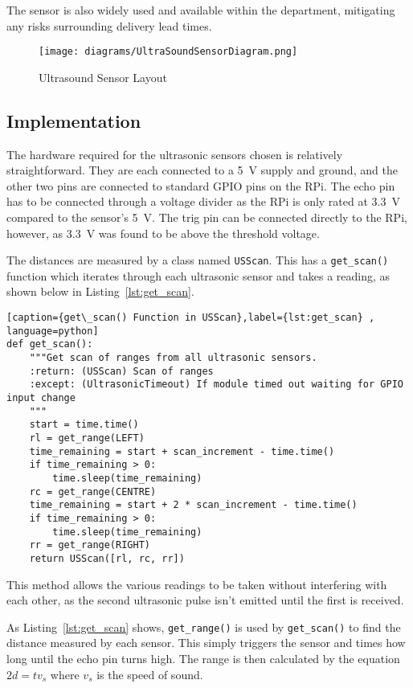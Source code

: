 The sensor is also widely used and available within the
department, mitigating any risks surrounding delivery lead times.

\begin{figure}[!ht]
	\centering
	\texttt{[image: diagrams/UltraSoundSensorDiagram.png]}
	\caption{Ultrasound Sensor Layout}\label{UltraSoundSensorDiagram}

\end{figure}

\subsection{Implementation}\label{elec/range/impl}
The hardware required for the ultrasonic sensors chosen is relatively straightforward.
They are each connected to a \SI{5}{\volt} supply and ground, and the other two pins are
connected to standard GPIO pins on the RPi. The echo pin has to be connected through
a voltage divider as the RPi is only rated at \SI{3.3}{\volt} compared to the sensor's \SI{5}{\volt}. The
trig pin can be connected directly to the RPi, however, as \SI{3.3}{\volt} was found to be above
the threshold voltage.

The distances are measured by a class named \verb|USScan|. This has a
\verb|get_scan()| function which iterates through each ultrasonic sensor and takes a reading,
as shown below in Listing~\ref{lst:get_scan}.

\begin{lstlisting}[caption={get\_scan() Function in USScan},label={lst:get_scan} , language=python]
def get_scan():
    """Get scan of ranges from all ultrasonic sensors.
    :return: (USScan) Scan of ranges
    :except: (UltrasonicTimeout) If module timed out waiting for GPIO input change
    """
    start = time.time()
    rl = get_range(LEFT)
    time_remaining = start + scan_increment - time.time()
    if time_remaining > 0:
        time.sleep(time_remaining)
    rc = get_range(CENTRE)
    time_remaining = start + 2 * scan_increment - time.time()
    if time_remaining > 0:
        time.sleep(time_remaining)
    rr = get_range(RIGHT)
    return USScan([rl, rc, rr])
\end{lstlisting}

This method allows the various readings to be taken without interfering with
each other, as the second ultrasonic pulse isn't emitted until the first is received.

As Listing~\ref{lst:get_scan} shows, \verb|get_range()| is used by
\verb|get_scan()| to find the distance measured by each sensor.
This simply triggers the sensor and times how long until the echo
pin turns high. The range is then calculated by the equation
$ 2d = tv_s$ where $v_s$ is the speed of sound.

